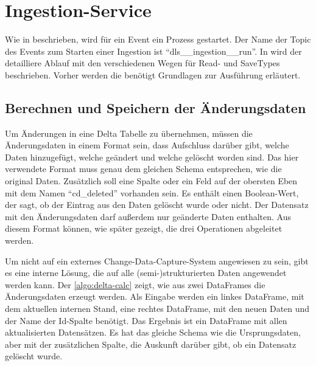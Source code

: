 \section{Ingestion-Service}

Wie in  beschrieben, wird für ein Event ein Prozess gestartet.
Der Name der Topic des Events zum Starten einer Ingestion ist "`dls\_\_ingestion\_\_run"'.
In  wird der detailliere Ablauf mit den verschiedenen Wegen für Read- und SaveTypes beschrieben.
Vorher werden die benötigt Grundlagen zur Ausführung erläutert.

\subsection{Berechnen und Speichern der Änderungsdaten}
Um Änderungen in eine Delta Tabelle zu übernehmen, müssen die Änderungsdaten in einem Format sein, dass Aufschluss darüber gibt, welche Daten hinzugefügt, welche geändert und welche gelöscht worden sind.
Das hier verwendete Format muss genau dem gleichen Schema entsprechen, wie die original Daten.
Zusätzlich soll eine Spalte oder ein Feld auf der obersten Eben mit dem Namen "`cd\_deleted"' vorhanden sein.
Es enthält einen Boolean-Wert, der sagt, ob der Eintrag aus den Daten gelöscht wurde oder nicht.
Der Datensatz mit den Änderungsdaten darf außerdem nur geänderte Daten enthalten.
Aus diesem Format können, wie später gezeigt, die drei Operationen abgeleitet werden.

Um nicht auf ein externes Change-Data-Capture-System angewiesen zu sein, gibt es eine interne Lösung, die auf alle (semi-)strukturierten Daten angewendet werden kann.
Der \cref{algo:delta-calc} zeigt, wie aus zwei DataFrames die Änderungsdaten erzeugt werden.
Als Eingabe werden ein linkes DataFrame, mit dem aktuellen internen Stand, eine rechtes DataFrame, mit den neuen Daten und der Name der Id-Spalte benötigt.
Das Ergebnis ist ein DataFrame mit allen aktualisierten Datensätzen.
Es hat das gleiche Schema wie die Ursprungsdaten, aber mit der zusätzlichen Spalte, die Auskunft darüber gibt, ob ein Datensatz gelöscht wurde.

